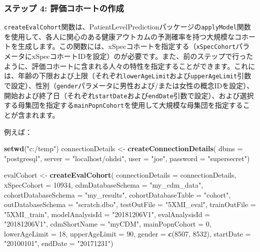 \documentclass[
  11pt]{book}
\newenvironment{Shaded}{\begin{snugshade}}{\end{snugshade}}
\newcommand{\AttributeTok}[1]{\textcolor[rgb]{0.13,0.29,0.53}{#1}}
\newcommand{\DecValTok}[1]{\textcolor[rgb]{0.00,0.00,0.81}{#1}}
\newcommand{\FunctionTok}[1]{\textcolor[rgb]{0.13,0.29,0.53}{\textbf{#1}}}
\newcommand{\NormalTok}[1]{#1}
\newcommand{\OtherTok}[1]{\textcolor[rgb]{0.56,0.35,0.01}{#1}}
\newcommand{\StringTok}[1]{\textcolor[rgb]{0.31,0.60,0.02}{#1}}
\theoremstyle{definition}
\theoremstyle{definition}
\theoremstyle{definition}
\theoremstyle{definition}
\theoremstyle{remark}
\begin{document}
\subsubsection*{ステップ 4: 評価コホートの作成}\label{ux30b9ux30c6ux30c3ux30d7-4-ux8a55ux4fa1ux30b3ux30dbux30fcux30c8ux306eux4f5cux6210}

\texttt{createEvalCohort}関数は、PatientLevelPredictionパッケージの\texttt{applyModel}関数を使用して、各人に関心のある健康アウトカムの予測確率を持つ大規模なコホートを生成します。この関数には、xSpecコホートを指定する（\texttt{xSpecCohort}パラメータにxSpecコホートIDを設定）のが必要です。また、前のステップで行ったように、評価コホートに含まれる人々の特性を指定することができます。これには、年齢の下限および上限（それぞれ\texttt{lowerAgeLimit}および\texttt{upperAgeLimit}引数で設定）、性別（\texttt{gender}パラメータに男性および/または女性の概念IDを設定）、開始および終了日（それぞれ\texttt{startDate}および\texttt{endDate}引数で設定）、および選択する母集団を指定する\texttt{mainPopnCohort}を使用して大規模な母集団を指定することが含まれます。

例えば：

\begin{Shaded}
\begin{Highlighting}[]
\FunctionTok{setwd}\NormalTok{(}\StringTok{"c:/temp"}\NormalTok{)}
\NormalTok{connectionDetails }\OtherTok{\textless{}{-}} \FunctionTok{createConnectionDetails}\NormalTok{(}
  \AttributeTok{dbms =} \StringTok{"postgresql"}\NormalTok{,}
  \AttributeTok{server =} \StringTok{"localhost/ohdsi"}\NormalTok{,}
  \AttributeTok{user =} \StringTok{"joe"}\NormalTok{,}
  \AttributeTok{password =} \StringTok{"supersecret"}\NormalTok{)}

\NormalTok{evalCohort }\OtherTok{\textless{}{-}} \FunctionTok{createEvalCohort}\NormalTok{(}
  \AttributeTok{connectionDetails =}\NormalTok{ connectionDetails,}
  \AttributeTok{xSpecCohort =} \DecValTok{10934}\NormalTok{,}
  \AttributeTok{cdmDatabaseSchema =} \StringTok{"my\_cdm\_data"}\NormalTok{,}
  \AttributeTok{cohortDatabaseSchema =} \StringTok{"my\_results"}\NormalTok{,}
  \AttributeTok{cohortDatabaseTable =} \StringTok{"cohort"}\NormalTok{,}
  \AttributeTok{outDatabaseSchema =} \StringTok{"scratch.dbo"}\NormalTok{,}
  \AttributeTok{testOutFile =} \StringTok{"5XMI\_eval"}\NormalTok{,}
  \AttributeTok{trainOutFile =} \StringTok{"5XMI\_train"}\NormalTok{,}
  \AttributeTok{modelAnalysisId =} \StringTok{"20181206V1"}\NormalTok{,}
  \AttributeTok{evalAnalysisId =} \StringTok{"20181206V1"}\NormalTok{,}
  \AttributeTok{cdmShortName =} \StringTok{"myCDM"}\NormalTok{,}
  \AttributeTok{mainPopnCohort =} \DecValTok{0}\NormalTok{,}
  \AttributeTok{lowerAgeLimit =} \DecValTok{18}\NormalTok{,}
  \AttributeTok{upperAgeLimit =} \DecValTok{90}\NormalTok{,}
  \AttributeTok{gender =} \FunctionTok{c}\NormalTok{(}\DecValTok{8507}\NormalTok{, }\DecValTok{8532}\NormalTok{),}
  \AttributeTok{startDate =} \StringTok{"20100101"}\NormalTok{,}
  \AttributeTok{endDate =} \StringTok{"20171231"}\NormalTok{)}
\end{Highlighting}
\end{Shaded}
\end{document}
